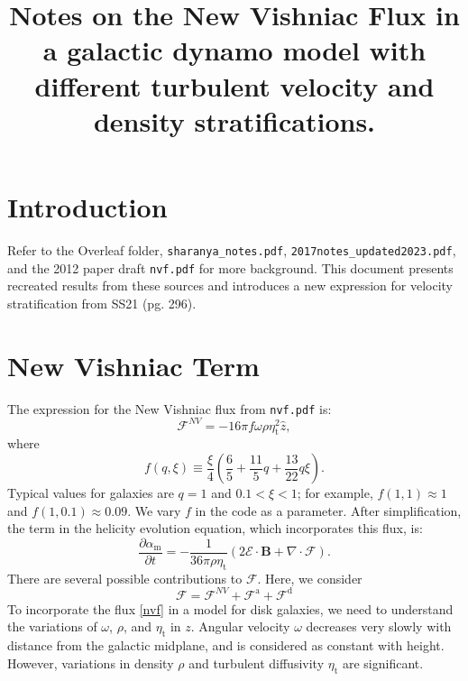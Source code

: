 \documentclass[a4paper,10pt]{article}
\title{Notes on the New Vishniac Flux in a galactic dynamo model with different turbulent velocity and density stratifications.}
\newcommand{\zhat}{\hat{z}}
\newcommand{\Emf}{\bm{\mathcal{E}}}
\newcommand{\Flux}{\bm{\mathcal{F}}}
\newcommand{\meanv}[1]{\bm{#1}}
\newcommand{\1}{_\mathrm{1}}					   	%
\newcommand{\2}{_\mathrm{2}}					   	%
\newcommand{\magn}{_\mathrm{m}}			   		%
\newcommand{\turb}{_\mathrm{t}}			   		%
\newcommand{\Adv}{\mathrm{a}}			   		%
\newcommand{\Diff}{\mathrm{d}}			   		%
\begin{document}
\maketitle

\section{Introduction}
\label{sec:intro}Refer to the Overleaf folder, \texttt{sharanya\_notes.pdf}, \texttt{2017notes\_updated2023.pdf}, and the 2012 paper draft \texttt{nvf.pdf} for more background. This document presents recreated results from these sources and introduces a new expression for velocity stratification from SS21 (pg. 296).

\section{New Vishniac Term}
The expression for the New Vishniac flux from \texttt{nvf.pdf} is:
\begin{equation}
  \label{nvf}
  \Flux^{NV} = -16\pi f \omega \rho \eta\turb^2 \zhat,
\end{equation}
where
\[
f(q,\xi) \equiv \frac{\xi}{4}\left(\frac{6}{5} + \frac{11}{5}q + \frac{13}{22}q\xi\right).
\]
Typical values for galaxies are \( q = 1 \) and \( 0.1 < \xi < 1 \); for example, \( f(1,1) \approx 1 \) and \( f(1,0.1) \approx 0.09 \). We vary \( f \) in the code as a parameter. After simplification, the term in the helicity evolution equation, which incorporates this flux, is:
\begin{equation}
\label{alpham}
\frac{\partial \alpha\magn}{\partial t}
= -\frac{1}{36\pi \rho \eta\turb} \left( 2\Emf \cdot \meanv{B} + \nabla \cdot \Flux \right).
\end{equation}
There are several possible contributions to \( \Flux \). Here, we consider
\begin{equation}
\label{flux}
\Flux = \Flux^{NV} + \Flux^\Adv + \Flux^\Diff
\end{equation}
To incorporate the flux \eqref{nvf} in a model for disk galaxies, we need to understand the variations of \( \omega \), \( \rho \), and \( \eta\turb \) in $z$. Angular velocity \( \omega \) decreases very slowly with distance from the galactic midplane, and is considered as constant with height. However, variations in density \( \rho \) and turbulent diffusivity \( \eta\turb \) are significant.
\end{document}
